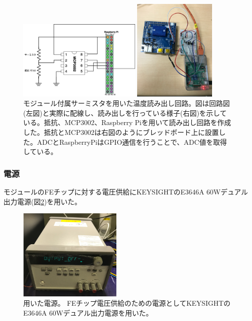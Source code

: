 \begin{figure}[h]\centering
  \begin{minipage}{0.5\hsize}
    \includegraphics[width=6cm]{./temp_circit.png}
  \end{minipage}
  \begin{minipage}{0.4\hsize}
    \includegraphics[width=4cm]{./temp_circit_pic.png}
  \end{minipage}
\caption[モジュール付属サーミスタを用いた温度読み出し回路]{モジュール付属サーミスタを用いた温度読み出し回路。図は回路図(左図)と実際に配線し、読み出しを行っている様子(右図)を示している。抵抗、MCP3002、Raspberry Piを用いて読み出し回路を作成した。抵抗とMCP3002は右図のようにブレッドボード上に設置した。ADCとRaspberryPiはGPIO通信\cite{5-9}を行うことで、ADC値を取得している。}
\label{demo_temp_circit_pic}
\end{figure}

\subsubsection{電源}
モジュールのFEチップに対する電圧供給にKEYSIGHTのE3646A 60Wデュアル出力電源\cite{5-1}(図\ref{demo_power_supply})を用いた。
\begin{figure}[h]\centering
\includegraphics[width=5cm]{./power_supply.png}
\caption[用いた電源]{用いた電源。 FEチップ電圧供給のための電源としてKEYSIGHTのE3646A 60Wデュアル出力電源\cite{5-1}を用いた。}
\label{demo_power_supply}
\end{figure}

